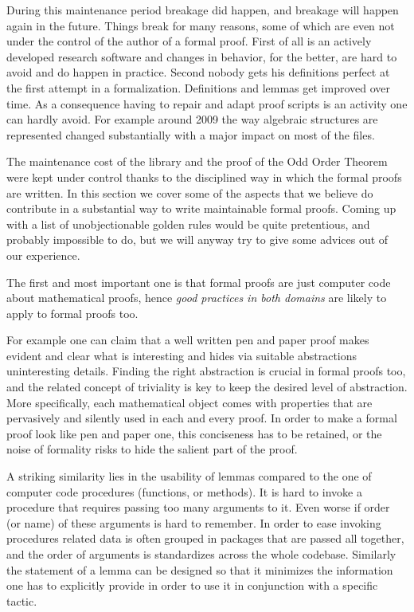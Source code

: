 During this maintenance period breakage did happen, and breakage will happen
again in the future. Things break for many reasons, some of which are even not
under the control of the author of a formal proof. First of all  \Coq{} is an
actively developed research software and changes in behavior, for the better,
are hard to avoid and do happen in practice. Second nobody gets his definitions
perfect at the first attempt in a formalization. Definitions and lemmas get
improved over time.  As a consequence having to repair and adapt proof scripts
is an activity one can hardly avoid.  For example around 2009 the way algebraic
structures are represented changed substantially with a major impact on most
of the files.

The maintenance cost of the  \mcbMC{} library and the proof of the
Odd Order Theorem were kept under control thanks to the disciplined
way in which the formal proofs are written.
In this section we cover some of the aspects that we believe do
contribute in a substantial way to write maintainable formal proofs.
Coming up with a list of unobjectionable golden rules would be quite pretentious,
and probably impossible to do, but we will anyway try to give some
advices out of our experience. 

The first and most important one is that formal proofs are just computer code
about mathematical proofs, hence \emph{good practices in both domains}
are likely to apply to formal proofs too.

For example one can claim that a well written pen and paper proof makes evident
and clear what is interesting and hides via suitable abstractions uninteresting
details. Finding the right abstraction is crucial in formal proofs too, and the
related concept of triviality is key to keep the desired level of abstraction.
More specifically, each mathematical object comes with properties that are
pervasively and silently used in each and every proof. In order to make a
formal proof look like pen and paper one, this conciseness has to be retained,
or the noise of formality risks to hide the salient part of the proof.

A striking similarity lies in the usability of lemmas
compared to the one of computer code procedures (functions, or methods).
It is hard to invoke a procedure that requires
passing too many arguments to it. Even worse if order (or name)
of these arguments is hard to remember.
In order to ease invoking procedures related data is often
grouped in packages that are passed all together,
and the order of arguments is standardizes across the whole codebase.
Similarly the statement of a lemma can be designed so that it
minimizes the information one has to explicitly provide
in order to use it in conjunction with a specific tactic.

